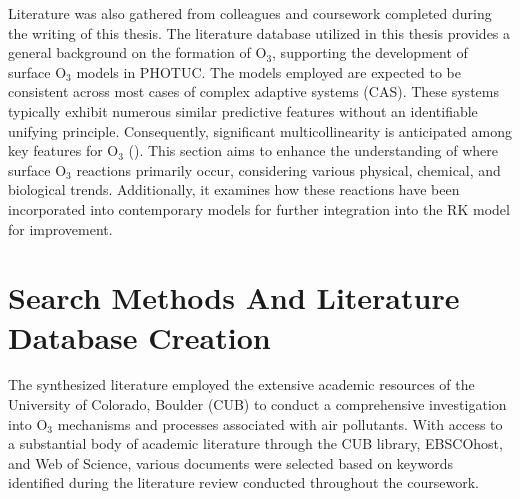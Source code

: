Literature was also gathered from colleagues and coursework completed during the writing of this thesis. The literature database utilized in this thesis provides a general background on the formation of O$_3$, supporting the development of surface O$_3$ models in PHOTUC. The models employed are expected to be consistent across most cases of complex adaptive systems (CAS). These systems typically exhibit numerous similar predictive features without an identifiable unifying principle. Consequently, significant multicollinearity is anticipated among key features for O$_3$ (\cite{alvarez-mendoza_spatial_2019}). This section aims to enhance the understanding of where surface O$_3$ reactions primarily occur, considering various physical, chemical, and biological trends. Additionally, it examines how these reactions have been incorporated into contemporary models for further integration into the RK model for improvement.
\section{Search Methods And Literature Database Creation} \label{litreview:searchmeth} The synthesized literature employed the extensive academic resources of the University of Colorado, Boulder (CUB) to conduct a comprehensive investigation into O$_3$ mechanisms and processes associated with air pollutants. With access to a substantial body of academic literature through the CUB library, EBSCOhost, and Web of Science, various documents were selected based on keywords identified during the literature review conducted throughout the coursework. 

